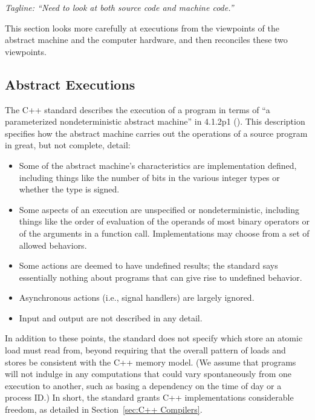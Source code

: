 \emph{Tagline: ``Need to look at both source code and machine code.''}

This section looks more carefully at executions from the viewpoints of
the abstract machine and the computer hardware, and then reconciles
these two viewpoints.

\subsection{Abstract Executions}
\label{sec:Abstract Executions}

The C++ standard describes the execution of a program in terms of
``a parameterized nondeterministic abstract machine'' in 4.1.2p1
().
This description specifies how the abstract machine carries out the
operations of a source program in great, but not complete, detail:
\begin{itemize}
\item	Some of the abstract machine's characteristics are
	implementation defined, including things like the number of
	bits in the various integer types
	or whether the  type is signed.
\item	Some aspects of an execution are unspecified or nondeterministic,
	including things like the order of evaluation of the operands
	of most binary operators or of the arguments in a function call.
	Implementations may choose from a set of allowed behaviors.
\item	Some actions are deemed to have undefined results; the standard
	says essentially nothing about programs that can give rise to
	undefined behavior.
\item	Asynchronous actions (i.e., signal handlers) are largely ignored.
\item	Input and output are not described in any detail.
\end{itemize}
In addition to these points, the standard does not specify which store
an atomic load must read from, beyond requiring that the overall
pattern of loads and stores be consistent with the C++ memory model.
(We assume that programs will not indulge in any computations that
could vary spontaneously from one execution to another,
such as basing a dependency on the time of day or a process ID.)
In short, the standard grants C++ implementations considerable freedom,
as detailed in
Section~\ref{sec:C++ Compilers}.

